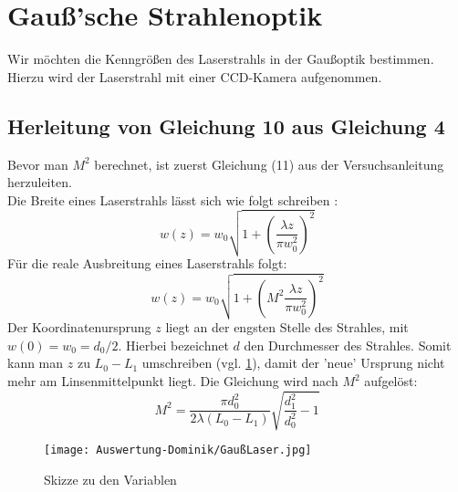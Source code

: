 \section{Gauß'sche Strahlenoptik}
Wir möchten die Kenngrößen des Laserstrahls in der Gaußoptik bestimmen.
Hierzu wird der Laserstrahl mit einer CCD-Kamera aufgenommen.
\subsection{Herleitung von Gleichung 10 aus Gleichung 4}
Bevor man $M^2$ berechnet, ist zuerst Gleichung (11) aus der Versuchsanleitung herzuleiten.\\
Die Breite eines Laserstrahls lässt sich wie folgt schreiben \citep[vgl.][S. 10]{Anleitung}:
\begin{equation}
    w(z)=w_0\sqrt{1+\left(\frac{\lambda z}{\pi w_0^2}\right)^2}
\end{equation}
Für die reale Ausbreitung eines Laserstrahls folgt:
\begin{equation}
    w(z)=w_0\sqrt{1+\left(M^2\frac{\lambda z}{\pi w_0^2}\right)^2}
\end{equation}
Der Koordinatenursprung $z$ liegt an der engsten Stelle des Strahles, mit $w(0)=w_0=d_0/2$.
Hierbei bezeichnet $d$ den Durchmesser des Strahles. Somit kann man $z$ zu $L_0-L_1$ umschreiben (vgl. \ref{img:skizze}), damit der 'neue' Ursprung nicht mehr am Linsenmittelpunkt liegt.
Die Gleichung wird nach $M^2$ aufgelöst:
\begin{equation}
    M^2=\frac{\pi d_0^2}{2\lambda\left(L_0-L_1\right)}\sqrt{\frac{d_1^2}{d_0^2}-1}
\end{equation}
\begin{figure}[h]
    \centering\texttt{[image: Auswertung-Dominik/GaußLaser.jpg]}
    \label{img:skizze}
    \caption{Skizze zu den Variablen}
\end{figure}
